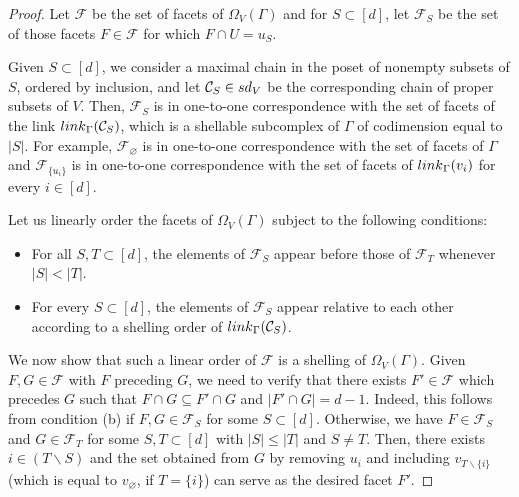 \documentclass[11pt]{amsart}
\theoremstyle{theorems}
\theoremstyle{definition}
\newcommand{\link}{{\rm link}}
\newcommand{\sd}{{\rm sd}}
\newcommand{\cC}{{\mathcal C}}
\newcommand{\fF}{{\mathcal F}}
\newcommand{\sm}{{\smallsetminus}}
\begin{document}
\begin{proof}
Let $\fF$ be the set of facets of $\Omega_V(\Gamma)$ and for 
$S \subset [d]$, let $\fF_S$ be the set of those facets 
$F \in \fF$ for which $F \cap U = u_S$. 

Given $S \subset [d]$, we consider a maximal chain in the 
poset of nonempty subsets of $S$, ordered by inclusion, and 
let $\cC_S \in \sd_V$ be the corresponding chain of proper 
subsets of $V$. Then, $\fF_S$ is in one-to-one correspondence 
with the set of facets of the link $\link_\Gamma(\cC_S)$, which 
is a shellable subcomplex of $\Gamma$ of codimension equal to 
$|S|$. For example, $\fF_\varnothing$ is in one-to-one 
correspondence with the set of facets of $\Gamma$ and 
$\fF_{ \{u_i\} }$ is in one-to-one correspondence with the 
set of facets of $\link_\Gamma(v_i)$ for every $i \in [d]$.

Let us linearly order the facets of $\Omega_V(\Gamma)$ 
subject to the following conditions:
%
\begin{itemize}
\item[(a)] 
For all $S, T \subset [d]$, the elements of $\fF_S$ appear 
before those of $\fF_T$ whenever $|S| < |T|$.

\item[(b)] 
For every $S \subset [d]$, the elements of $\fF_S$ appear 
relative to each other according to a shelling order of 
$\link_\Gamma(\cC_S)$.
\end{itemize}

We now show that such a linear order of $\fF$ is a shelling 
of $\Omega_V(\Gamma)$. Given $F, G \in \fF$ with $F$ preceding 
$G$, we need to verify that there exists $F' \in \fF$ which 
precedes $G$ such that $F \cap G \subseteq F' \cap G$ and 
$|F' \cap G| = d-1$. Indeed, this follows from condition (b) 
if $F, G \in \fF_S$ for some $S \subset [d]$. Otherwise, we 
have $F \in \fF_S$ and $G \in \fF_T$ for some $S, T \subset 
[d]$ with $|S| \le |T|$ and $S \ne T$. Then, there exists 
$i \in (T \sm S)$ and the set obtained from $G$ by removing 
$u_i$ and including $v_{T \sm \{i\}}$ (which is equal to 
$v_\varnothing$, if $T = \{i\}$) can serve as the desired 
facet $F'$. 
\end{proof}
\end{document}
